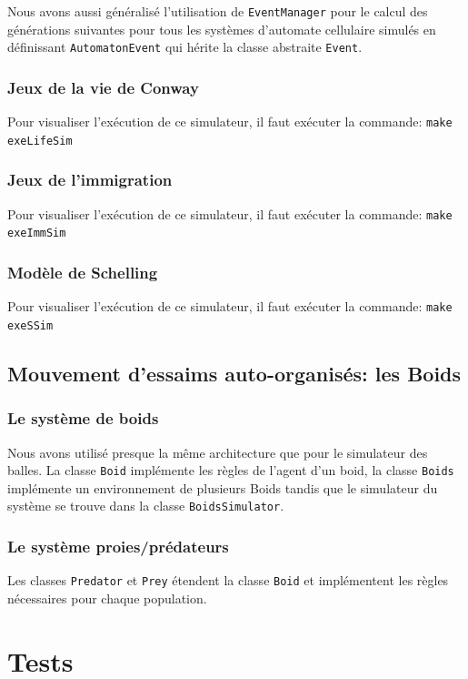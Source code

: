 \documentclass [a4paper,11pt,titlepage] {article}
\begin{document}
Nous avons aussi généralisé l'utilisation de \texttt{EventManager} pour le calcul des générations suivantes pour tous les systèmes d'automate cellulaire simulés en définissant \texttt{AutomatonEvent} qui hérite la classe abstraite \texttt{Event}.

\subsubsection {Jeux de la vie de Conway}
Pour visualiser l'exécution de ce simulateur, il faut exécuter la commande: \texttt{make exeLifeSim}

\subsubsection {Jeux de l'immigration}
Pour visualiser l'exécution de ce simulateur, il faut exécuter la commande: \texttt{make exeImmSim}

\subsubsection {Modèle de Schelling}
Pour visualiser l'exécution de ce simulateur, il faut exécuter la commande: \texttt{make exeSSim}
\subsection{Mouvement d’essaims auto-organisés: les Boids}
\subsubsection {Le système de boids}
Nous avons utilisé presque la même architecture que pour le simulateur des balles. La classe \texttt{Boid} implémente les règles de l'agent d'un boid, la classe \texttt{Boids} implémente un environnement de plusieurs Boids tandis que le simulateur du système se trouve dans la classe \texttt{BoidsSimulator}.
\subsubsection {Le système proies/prédateurs}

Les classes \texttt{Predator} et \texttt{Prey} étendent la classe \texttt{Boid} et implémentent les règles nécessaires pour chaque population.

\section {Tests}
\end{document}
